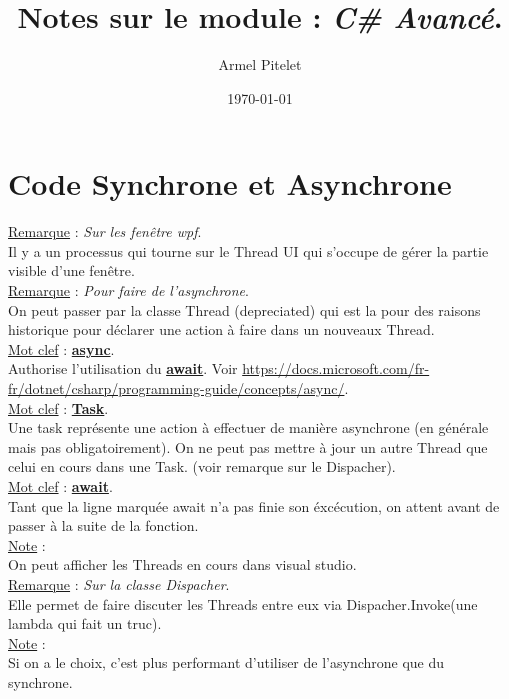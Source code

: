 \documentclass[a4paper,12pt,twoside]{article}
\title{Notes sur le module : \textit{C\# Avancé}.}
\author{Armel Pitelet}
\date{\today}
\newcommand{\urlcolor}{magenta}  %
\newcommand{\keycolor}{purple} %
\newcommand{\incode}[1]{{\footnotesize\ttfamily #1}} %
\newcommand{\rem}[2]{\noindent\underline{Remarque} : \textit{#1}.\\ \indent #2}
\newcommand{\note}[1]{\noindent\underline{Note} : \\ \indent #1}
\newcommand{\keyref}[2]{\hypersetup{urlcolor=\keycolor} \href{#1}{\textbf{#2}}\hypersetup{urlcolor=\urlcolor}}
\newcommand{\keyword}[3]{\noindent\underline{Mot clef} : \keyref{#1}{#2}. \\ \indent #3}
\begin{document}
\maketitle
\tableofcontents

\section{Code Synchrone et Asynchrone}

\rem{Sur les fenêtre wpf}{Il y a un processus qui tourne sur le Thread UI qui s'occupe de gérer la partie visible d'une fenêtre.}\\

\rem{Pour faire de l'asynchrone}{On peut passer par la classe Thread (depreciated) qui est la pour des raisons historique pour déclarer une action à faire dans un nouveaux Thread.}\\

\keyword{https://docs.microsoft.com/fr-fr/dotnet/csharp/language-reference/keywords/async}{async}{Authorise l'utilisation du \keyref{https://docs.microsoft.com/fr-fr/dotnet/csharp/language-reference/operators/await}{await}. Voir \url{https://docs.microsoft.com/fr-fr/dotnet/csharp/programming-guide/concepts/async/}.}\\

\keyword{https://docs.microsoft.com/fr-fr/dotnet/api/system.threading.tasks.task?view=net-6.0}{Task}{Une task représente une action à effectuer de manière asynchrone (en générale mais pas obligatoirement). On ne peut pas mettre à jour un autre Thread que celui en cours dans une Task. (voir remarque sur le \incode{Dispacher}).}\\

\keyword{https://docs.microsoft.com/fr-fr/dotnet/csharp/language-reference/operators/await}{await}{Tant que la ligne marquée await n'a pas finie son éxcécution, on attent avant de passer à la suite de la fonction.}\\

\note{On peut afficher les Threads en cours dans visual studio.}\\

\rem{Sur la classe \incode{Dispacher}}{Elle permet de faire discuter les Threads entre eux via \incode{Dispacher.Invoke(une lambda qui fait un truc)}.}\\

\note{Si on a le choix, c'est plus performant d'utiliser de l'asynchrone que du synchrone.}\\
\end{document}
